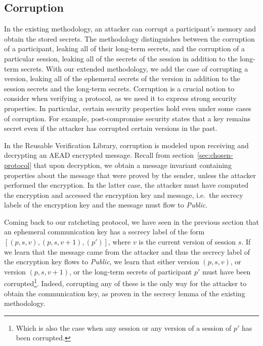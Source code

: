 \subsection{Corruption}

In the existing methodology, an attacker can corrupt a participant's memory and obtain the stored secrets.
The methodology distinguishes between the corruption of a participant, leaking all of their long-term secrets, and the corruption of a particular session, leaking all of the secrets of the session in addition to the long-term secrets.
With our extended methodology, we add the case of corrupting a version, leaking all of the ephemeral secrets of the version in addition to the session secrets and the long-term secrets.
Corruption is a crucial notion to consider when verifying a protocol, as we need it to express strong security properties. In particular, certain security properties hold even under some cases of corruption.
For example, post-compromise security states that a key remains secret even if the attacker has corrupted certain versions in the past.

In the Reusable Verification Library, corruption is modeled upon receiving and decrypting an AEAD encrypted message. 
Recall from section~\ref{sec:chosen-protocol} that upon decryption, we obtain a message invariant containing properties about the message that were proved by the sender, unless the attacker performed the encryption.
In the latter case, the attacker must have computed the encryption and accessed the encryption key and message, i.e.\ the secrecy labels of the encryption key and the message must flow to \emph{Public}.

Coming back to our ratcheting protocol, we have seen in the previous section that an ephemeral communication key has a secrecy label of the form $[(p,s,v),(p,s,v+1),(p')]$, where $v$ is the current version of session $s$.
If we learn that the message came from the attacker and thus the secrecy label of the encryption key flows to \emph{Public}, we learn that either version $(p,s,v)$, or version $(p,s,v+1)$, or the long-term secrets of participant $p'$ must have been corrupted\footnote{Which is also the case when any session or any version of a session of $p'$ has been corrupted.}.
Indeed, corrupting any of these is the only way for the attacker to obtain the communication key, as proven in the secrecy lemma of the existing methodology.

